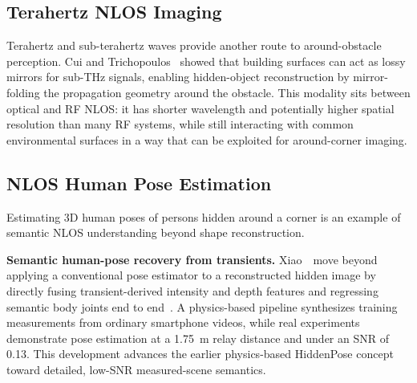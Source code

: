 \subsection{Terahertz NLOS Imaging}
Terahertz and sub-terahertz waves provide another route to around-obstacle perception. Cui and Trichopoulos~\cite{cuiActiveTHzNLOS2024} showed that building surfaces can act as lossy mirrors for sub-THz signals, enabling hidden-object reconstruction by mirror-folding the propagation geometry around the obstacle. This modality sits between optical and RF NLOS: it has shorter wavelength and potentially higher spatial resolution than many RF systems, while still interacting with common environmental surfaces in a way that can be exploited for around-corner imaging.

\subsection{NLOS Human Pose Estimation}
Estimating 3D human poses of persons hidden around a corner is an example of semantic NLOS understanding beyond shape reconstruction.

\vspace{0.8mm}
\noindent \textbf{Semantic human-pose recovery from transients.}
Xiao~\etal~move beyond applying a conventional pose estimator to a reconstructed hidden image by directly fusing transient-derived intensity and depth features and regressing semantic body joints end to end~\cite{xiaoNLOSHumanPose2026}. A physics-based pipeline synthesizes training measurements from ordinary smartphone videos, while real experiments demonstrate pose estimation at a 1.75~m relay distance and under an SNR of 0.13. This development advances the earlier physics-based HiddenPose concept toward detailed, low-SNR measured-scene semantics.


